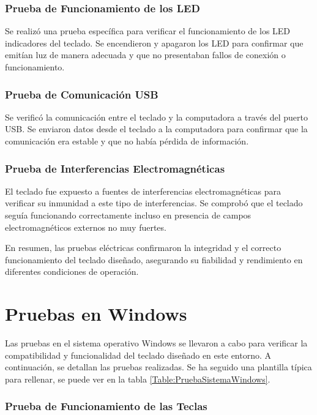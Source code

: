 \subsubsection{Prueba de Funcionamiento de los \gls{LED}}

Se realizó una prueba específica para verificar el funcionamiento de los \gls{LED} indicadores del teclado. Se encendieron y apagaron los \gls{LED} para confirmar que emitían luz de manera adecuada y que no presentaban fallos de conexión o funcionamiento.

\subsubsection{Prueba de Comunicación USB}

Se verificó la comunicación entre el teclado y la computadora a través del puerto \gls{USB}. Se enviaron datos desde el teclado a la computadora para confirmar que la comunicación era estable y que no había pérdida de información.

\subsubsection{Prueba de Interferencias Electromagnéticas}

El teclado fue expuesto a fuentes de interferencias electromagnéticas para verificar su inmunidad a este tipo de interferencias. Se comprobó que el teclado seguía funcionando correctamente incluso en presencia de campos electromagnéticos externos no muy fuertes.

En resumen, las pruebas eléctricas confirmaron la integridad y el correcto funcionamiento del teclado diseñado, asegurando su fiabilidad y rendimiento en diferentes condiciones de operación.

\section{Pruebas en \gls{Windows}}

Las pruebas en el sistema operativo \gls{Windows} se llevaron a cabo para verificar la compatibilidad y funcionalidad del teclado diseñado en este entorno. A continuación, se detallan las pruebas realizadas. Se ha seguido una plantilla típica para rellenar, se puede ver en la tabla \ref{Table:PruebaSistemaWindows}.

\subsubsection{Prueba de Funcionamiento de las Teclas}

